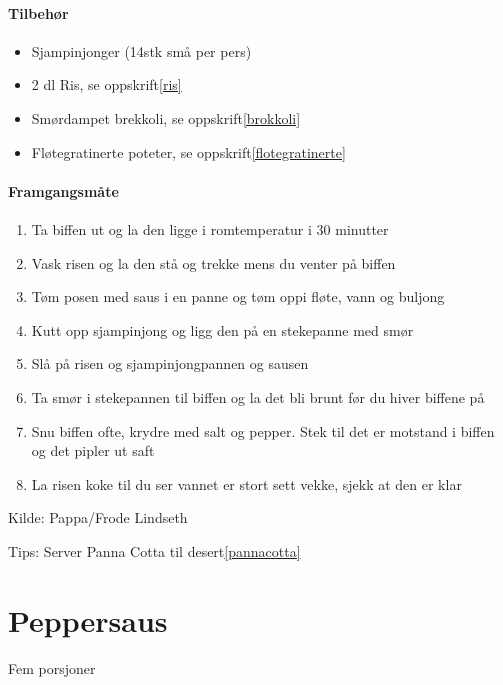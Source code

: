 \documentclass[12pt,a4paper]{book}
\begin{document}
\paragraph{Tilbehør}
\begin{itemize}[noitemsep]
	\item Sjampinjonger (14stk små per pers)
	\item 2 dl Ris, se oppskrift\ref{ris}
	\item Smørdampet brekkoli, se oppskrift\ref{brokkoli}
	\item Fløtegratinerte poteter, se oppskrift\ref{flotegratinerte}
\end{itemize}

\paragraph{Framgangsmåte}
\begin{enumerate}[noitemsep]
	\item Ta biffen ut og la den ligge i romtemperatur i 30 minutter
	\item Vask risen og la den stå og trekke mens du venter på biffen
	\item Tøm posen med saus i en panne og tøm oppi fløte, vann og buljong
	\item Kutt opp sjampinjong og ligg den på en stekepanne med smør
	\item Slå på risen og sjampinjongpannen og sausen
	\item Ta smør i stekepannen til biffen og la det bli brunt før du hiver biffene på
	\item Snu biffen ofte, krydre med salt og pepper. Stek til det er motstand i biffen og det pipler ut saft
	\item La risen koke til du ser vannet er stort sett vekke, sjekk at den er klar
\end{enumerate}

Kilde: Pappa/Frode Lindseth

Tips: Server Panna Cotta til desert\ref{pannacotta}
\clearpage{}
\clearpage{}\section{﻿Peppersaus}
\label{peppersaus}
Fem porsjoner
\end{document}
